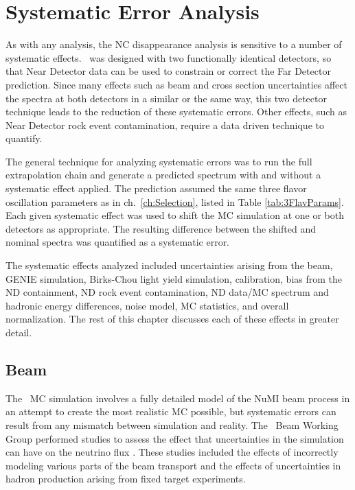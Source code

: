 \chapter{Systematic Error Analysis}
\label{ch:Systs}

As with any analysis, the NC disappearance analysis is sensitive to a number of systematic effects. \nova~was designed with two functionally identical detectors, so that Near Detector data can be used to constrain or correct the Far Detector prediction. Since many effects such as beam and cross section uncertainties affect the spectra at both detectors in a similar or the same way, this two detector technique leads to the reduction of these systematic errors. Other effects, such as Near Detector rock event contamination, require a data driven technique to quantify.

The general technique for analyzing systematic errors was to run the full extrapolation chain and generate a predicted spectrum with and without a systematic effect applied. The prediction assumed the same three flavor oscillation parameters as in ch.~\ref{ch:Selection}, listed in Table \ref{tab:3FlavParams}. Each given systematic effect was used to shift the MC simulation at one or both detectors as appropriate. The resulting difference between the shifted and nominal spectra was quantified as a systematic error.

The systematic effects analyzed included uncertainties arising from the beam, GENIE simulation, Birks-Chou light yield simulation, calibration, bias from the ND containment, ND rock event contamination, ND data/MC spectrum and hadronic energy differences, noise model, MC statistics, and overall normalization. The rest of this chapter discusses each of these effects in greater detail.

\section{Beam}

The \nova~MC simulation involves a fully detailed model of the NuMI beam process in an attempt to create the most realistic MC possible, but systematic errors can result from any mismatch between simulation and reality. The \nova~Beam Working Group performed studies to assess the effect that uncertainties in the simulation can have on the neutrino flux \cite{ref:TNBeam}. These studies included the effects of incorrectly modeling various parts of the beam transport and the effects of uncertainties in hadron production arising from fixed target experiments.

